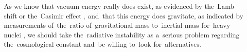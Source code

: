 As we know that vacuum energy really does exist, as evidenced by the~Lamb shift \parencite{2020Physi...2..105M} or the~Casimir effect \parencite{2006BrJPh..36.1137F}, and~that this energy does gravitate, as indicated by measurements of~the~ratio of~gravitational mass to~inertial mass for~heavy nuclei \parencite{Braginskii:1971tn}, we should take the~radiative instability as a~serious problem regarding the~cosmological constant and~be willing to~look for~alternatives.%
